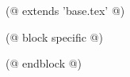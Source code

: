 (@ extends 'base.tex' @)

(@ block specific @)
    
    
    \setmainlanguage{(* language.id *)}
(@ endblock @)
